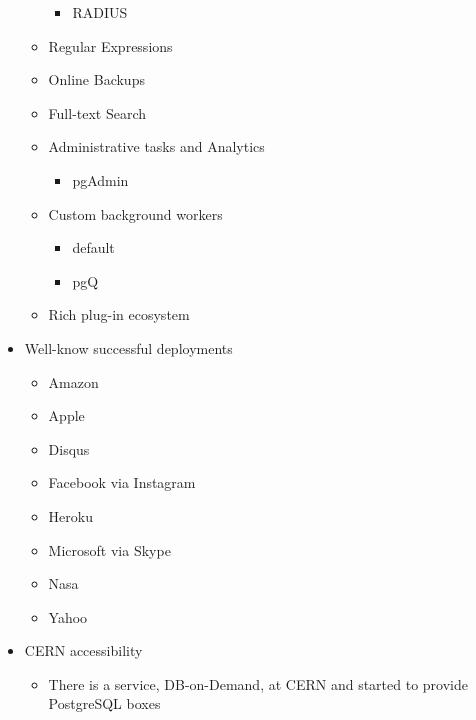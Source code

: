 \begin{itemize}
\begin{itemize}
\begin{itemize}
	  \item RADIUS
	\end{itemize}
	\item Regular Expressions
	\item Online Backups
	\item Full-text Search
	\item Administrative tasks and Analytics
	\begin{itemize}
	  \item pgAdmin
	\end{itemize}
    \item Custom background workers
	\begin{itemize}
	  \item default
	  \item pgQ
	\end{itemize}
	\item Rich plug-in ecosystem
  \end{itemize}
  \item Well-know successful deployments
  \begin{itemize}
    \item Amazon
    \item Apple
    \item Disqus
    \item Facebook via Instagram
    \item Heroku
    \item Microsoft via Skype
    \item Nasa
    \item Yahoo
  \end{itemize}
  \item CERN accessibility
  \begin{itemize}
    \item There is a service, DB-on-Demand, at CERN and started to provide PostgreSQL boxes
  \end{itemize}
\end{itemize}
